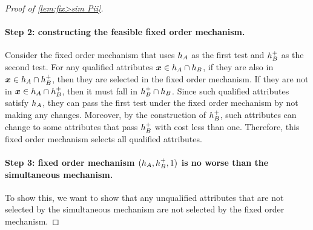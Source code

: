 \begin{proof}[Proof of \cref{lem:fix>sim Pii}]
    


\paragraph{Step 2: constructing the feasible fixed order mechanism.} Consider the fixed order mechanism that uses  $h_A$  as the first test and $h_B^+$ as the second test.
For any qualified attributes $\boldsymbol{x}\in h_A\cap h_B$, if they are also in $\boldsymbol{x}\in h_A\cap h_B^+$, then they are selected in the fixed order mechanism.
If they are not in $\boldsymbol{x}\in h_A\cap h_B^+$, then it must fall in $h_B^+\cap h_B$.
Since such qualified attributes satisfy $h_A$, they can pass the first test under the fixed order mechanism by not making any changes.
Moreover, by the construction of $h_B^+$, such attributes can change to some attributes that pass $h_B^+$ with cost less than one.
Therefore, this fixed order mechanism selects all qualified attributes.



\paragraph{Step 3: fixed order mechanism $(h_A,h_B^+,1)$ is no worse than the simultaneous mechanism.} 
To show this, we want to show that any unqualified attributes that are not selected by the simultaneous mechanism are not selected by the fixed order mechanism.


\end{proof}
